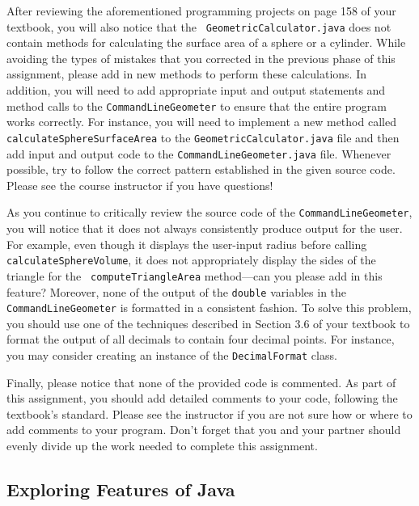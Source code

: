 \begin{sloppypar}
  After reviewing the aforementioned programming projects on page 158 of your textbook, you will also notice that the {\tt
  GeometricCalculator.java} does not contain methods for calculating the surface area of a sphere or a cylinder.  While
  avoiding the types of mistakes that you corrected in the previous phase of this assignment, please add in new methods
  to perform these calculations. In addition, you will need to add appropriate input and output statements and method
  calls to the {\tt CommandLineGeometer} to ensure that the entire program works correctly. For instance, you will need to
  implement a new method called {\tt calculateSphereSurfaceArea} to the {\tt GeometricCalculator.java} file and then add
  input and output code to the {\tt CommandLineGeometer.java} file. Whenever possible, try to follow the correct
  pattern established in the given source code. Please see the course instructor if you have questions!
\end{sloppypar}

As you continue to critically review the source code of the {\tt CommandLineGeometer}, you will notice that it does not
always consistently produce output for the user.  For example, even though it displays the user-input radius before
calling {\tt calculateSphereVolume}, it does not appropriately display the sides of the triangle for the {\tt
computeTriangleArea} method---can you please add in this feature? Moreover, none of the output of the {\tt double}
variables in the {\tt CommandLineGeometer} is formatted in a consistent fashion. To solve this problem, you should use
one of the techniques described in Section 3.6 of your textbook to format the output of all decimals to contain four
decimal points. For instance, you may consider creating an instance of the {\tt DecimalFormat} class.

Finally, please notice that none of the provided code is commented.  As part of this assignment, you should add
detailed comments to your code, following the textbook's standard. Please see the instructor if you are not sure how or
where to add comments to your program. Don't forget that you and your partner should evenly divide up the work needed to
complete this assignment. 

\vspace*{-.1in}
\subsection*{Exploring Features of Java}

